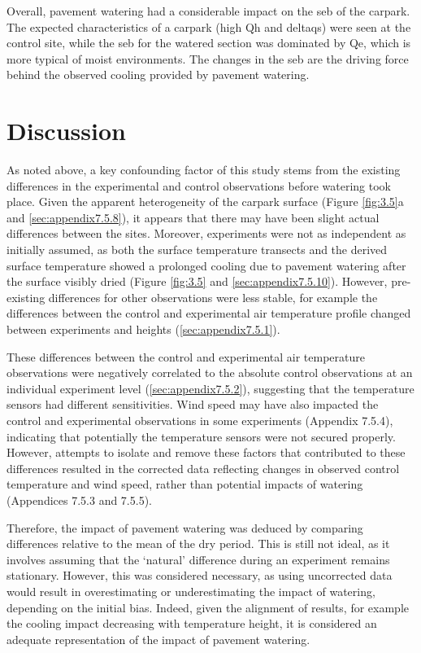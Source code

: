 \documentclass[final,3p,times,authoryear]{elsarticle}
\begin{document}
Overall, pavement watering had a considerable impact on the \gls{seb} of the carpark. The expected characteristics of a carpark (high \gls{Qh} and \gls{deltaqs}) were seen at the control site, while the \gls{seb} for the watered section was dominated by \gls{Qe}, which is more typical of moist environments. The changes in the \gls{seb} are the driving force behind the observed cooling provided by pavement watering.

\section{Discussion}\label{sec:discussion}
 
As noted above, a key confounding factor of this study stems from the existing differences in the experimental and control observations before watering took place. Given the apparent heterogeneity of the carpark surface (Figure \ref{fig:3.5}a and \ref{sec:appendix7.5.8}), it appears that there may have been slight actual differences between the sites. Moreover, experiments were not as independent as initially assumed, as both the surface temperature transects and the derived surface temperature showed a prolonged cooling due to pavement watering after the surface visibly dried (Figure \ref{fig:3.5} and \ref{sec:appendix7.5.10}). However, pre-existing differences for other observations were less stable, for example the differences between the control and experimental air temperature profile changed between experiments and heights (\ref{sec:appendix7.5.1}).

These differences between the control and experimental air temperature observations
were negatively correlated to the absolute control observations at an individual
experiment level (\ref{sec:appendix7.5.2}), suggesting that the temperature sensors had different sensitivities. Wind speed may have also impacted the control and experimental
observations in some experiments (Appendix 7.5.4), indicating that potentially the
temperature sensors were not secured properly. However, attempts to isolate and
remove these factors that contributed to these differences resulted in the corrected data reflecting changes in observed control temperature and wind speed, rather than potential
impacts of watering (Appendices 7.5.3 and 7.5.5).

Therefore, the impact of pavement watering was deduced by comparing differences
relative to the mean of the dry period. This is still not ideal, as it involves assuming that the `natural' difference during an experiment remains stationary. However, this was
considered necessary, as using uncorrected data would result in overestimating or
underestimating the impact of watering, depending on the initial bias. Indeed, given the
alignment of results, for example the cooling impact decreasing with temperature
height, it is considered an adequate representation of the impact of pavement watering.
\end{document}
